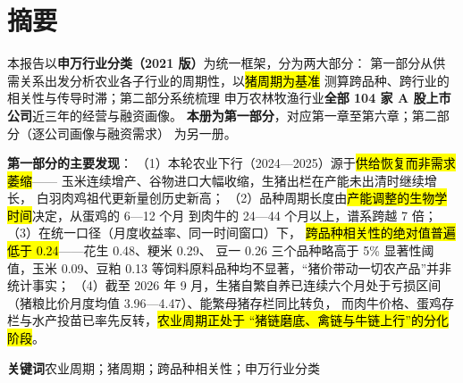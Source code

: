 \section*{摘要}

\begin{keybox}[报告要点]
\small
本报告以\textbf{申万行业分类（2021 版）}为统一框架，分为两大部分：
第一部分从供需关系出发分析农业各子行业的周期性，以\hl{猪周期为基准}
测算跨品种、跨行业的相关性与传导时滞；第二部分系统梳理
申万农林牧渔行业\textbf{全部 \num{104} 家 A 股上市公司}近三年的经营与融资画像。
\textbf{本册为第一部分}，对应第一章至第六章；第二部分（逐公司画像与融资需求）
为另一册。

\textbf{第一部分的主要发现}：
（1）本轮农业下行（2024---2025）源于\hl{供给恢复而非需求萎缩}——
玉米连续增产、谷物进口大幅收缩，生猪出栏在产能未出清时继续增长，
白羽肉鸡祖代更新量创历史新高；
（2）品种周期长度由\hl{产能调整的生物学时间}决定，从蛋鸡的 \num{6}---\num{12} 个月
到肉牛的 \num{24}---\num{44} 个月以上，谱系跨越 \num{7} 倍；
（3）在统一口径（月度收益率、同一时间窗口）下，
\hl{跨品种相关性的绝对值普遍低于 \num{0.24}}——花生 \num{+0.48}、粳米 \num{+0.29}、
豆一 \num{+0.26} 三个品种略高于 5\% 显著性阈值，玉米 \num{+0.09}、豆粕 \num{+0.13}
等饲料原料品种均不显著，“猪价带动一切农产品”并非统计事实；
（4）截至 2026 年 9 月，生猪自繁自养已连续六个月处于亏损区间
（猪粮比价月度均值 \num{3.96}---\num{4.47}）、能繁母猪存栏同比转负，
而肉牛价格、蛋鸡存栏与水产投苗已率先反转，\hl{农业周期正处于
“猪链磨底、禽链与牛链上行”的分化阶段}。
\end{keybox}

\vspace{6pt}
\noindent\textbf{关键词}\quad 农业周期；猪周期；跨品种相关性；申万行业分类
\clearpage
